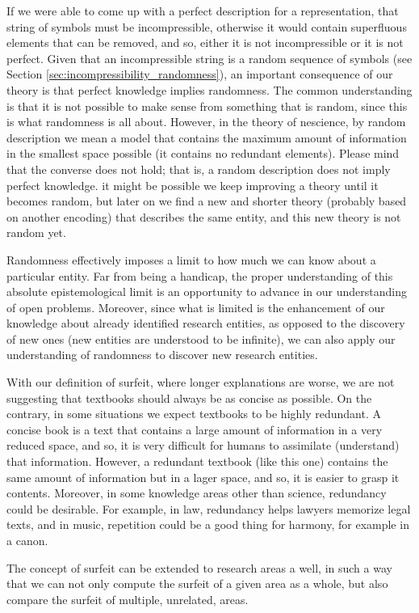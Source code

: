 If we were able to come up with a perfect description for a representation, that string of symbols must be incompressible, otherwise it would contain superfluous elements that can be removed, and so, either it is not incompressible or it is not perfect. Given that an incompressible string is a random sequence of symbols (see Section \ref{sec:incompressibility_randomness}), an important consequence of our theory is that perfect knowledge implies randomness. The common understanding is that it is not possible to make sense from something that is random, since this is what randomness is all about. However, in the theory of nescience, by random description we mean a model that contains the maximum amount of information in the smallest space possible (it contains no redundant elements). Please mind that the converse does not hold; that is, a random description does not imply perfect knowledge. it might be possible we keep improving a theory until it becomes random, but later on we find a new and shorter theory (probably based on another encoding) that describes the same entity, and this new theory is not random yet.

Randomness effectively imposes a limit to how much we can know about a particular entity. Far from being a handicap, the proper understanding of this absolute epistemological limit is an opportunity to advance in our understanding of open problems. Moreover, since what is limited is the enhancement of our knowledge about already identified research entities, as opposed to the discovery of new ones (new entities are understood to be infinite), we can also apply our understanding of randomness to discover new research entities.

With our definition of surfeit, where longer explanations are worse, we are not suggesting that textbooks should always be as concise as possible. On the contrary, in some situations we expect textbooks to be highly redundant. A concise book is a text that contains a large amount of information in a very reduced space, and so, it is very difficult for humans to assimilate (understand) that information. However, a redundant textbook (like this one) contains the same amount of information but in a lager space, and so, it is easier to grasp it contents. Moreover, in some knowledge areas other than science, redundancy could be desirable. For example, in law, redundancy helps lawyers memorize legal texts, and in music, repetition could be a good thing for harmony, for example in a canon.

The concept of surfeit can be extended to research areas a well, in such a way that we can not only compute the surfeit of a given area as a whole, but also compare the surfeit of multiple, unrelated, areas.

